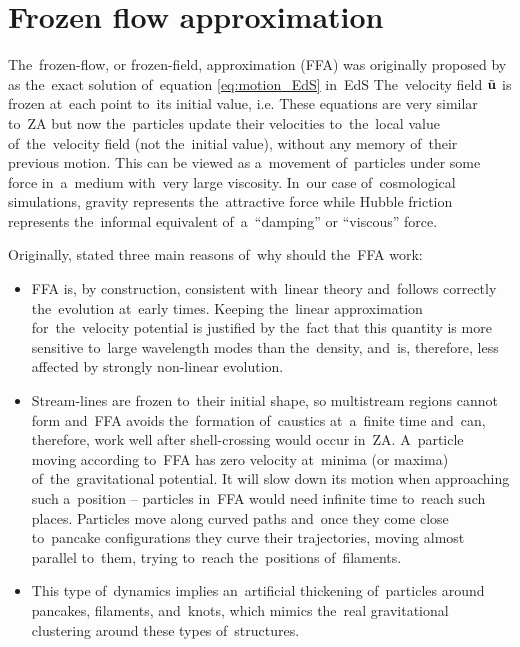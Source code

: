 \section{Frozen flow approximation}
The~frozen-flow, or frozen-field, approximation (FFA) was originally proposed by \textcite{Matarrese:1992be} as the~exact solution of~equation \eqref{eq:motion_EdS} in~EdS
The~velocity field $\tilde{\mathbf u}$ is frozen at~each point to~its initial value, i.e.
These equations are very similar to~ZA but now the~particles update their velocities to~the~local value of~the~velocity field (not the~initial value), without any memory of~their previous motion. This can be viewed as a~movement of~particles under some force in~a~medium with~very large viscosity. In~our case of~cosmological simulations, gravity represents the~attractive force while Hubble friction represents the~informal equivalent of~a~``damping'' or ``viscous'' force.

Originally, \textcite{Matarrese:1992be} stated three main reasons of~why should the~FFA work:
{\itshape
\begin{itemize}
\item FFA is, by construction, consistent with~linear theory and~follows correctly the~evolution at~early times. Keeping the~linear approximation for~the~velocity potential is justified by the~fact that this quantity is more sensitive to~large wavelength modes than the~density, and~is, therefore, less affected by strongly non-linear evolution.
\item Stream-lines are frozen to~their initial shape, so multistream regions cannot form and~FFA avoids the~formation of~caustics at~a~finite time and~can, therefore, work well after shell-crossing would occur in~ZA. A~particle moving according to~FFA has zero velocity at~minima (or maxima) of~the~gravitational potential. It will slow down its motion when approaching such a~position -- particles in~FFA would need infinite time to~reach such places. Particles move along curved paths and~once they come close to~pancake configurations they curve their trajectories, moving almost parallel to~them, trying to~reach the~positions of~filaments.
\item This type of~dynamics implies an~artificial thickening of~particles around pancakes, filaments, and~knots, which mimics the~real gravitational clustering around these types of~structures.
\end{itemize}
}

